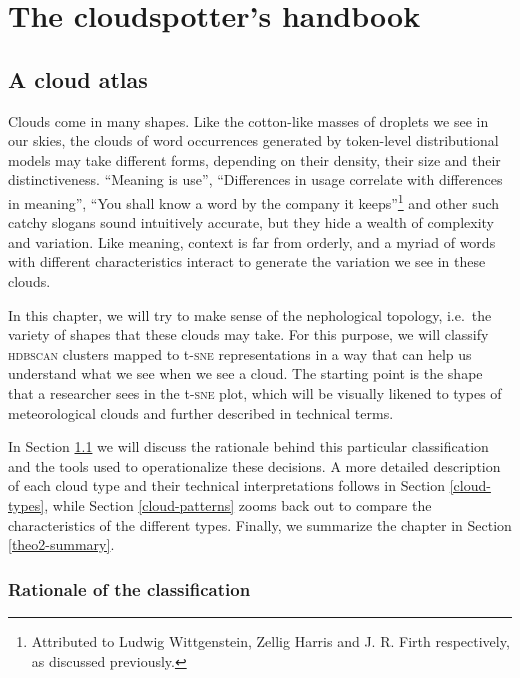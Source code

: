 \documentclass[
]{book}
\begin{document}
\hypertarget{part-the-cloudspotters-handbook}{%
\part{The cloudspotter's handbook}\label{part-the-cloudspotters-handbook}}

\hypertarget{shapes}{%
\chapter{A cloud atlas}\label{shapes}}

Clouds come in many shapes. Like the cotton-like masses of droplets we see in our skies, the clouds of word occurrences generated by token-level distributional models may take different forms, depending on their density, their size and their distinctiveness. ``Meaning is use'', ``Differences in usage correlate with differences in meaning'', ``You shall know a word by the company it keeps''\footnote{Attributed to Ludwig Wittgenstein, Zellig Harris and J. R. Firth respectively, as discussed previously.} and other such catchy slogans sound intuitively accurate, but they hide a wealth of complexity and variation. Like meaning, context is far from orderly, and a myriad of words with different characteristics interact to generate the variation we see in these clouds.

In this chapter, we will try to make sense of the nephological topology, i.e.~the variety of shapes that these clouds may take. For this purpose, we will classify \textsc{hdbscan} clusters mapped to t-\textsc{sne} representations in a way that can help us understand what we see when we see a cloud. The starting point is the shape that a researcher sees in the t-\textsc{sne} plot, which will be visually likened to types of meteorological clouds and further described in technical terms.

In Section \ref{theo2-rationale} we will discuss the rationale behind this particular classification and the tools used to operationalize these decisions. A more detailed description of each cloud type and their technical interpretations follows in Section \ref{cloud-types}, while Section \ref{cloud-patterns} zooms back out to compare the characteristics of the different types. Finally, we summarize the chapter in Section \ref{theo2-summary}.

\hypertarget{theo2-rationale}{%
\section{Rationale of the classification}\label{theo2-rationale}}
\end{document}

